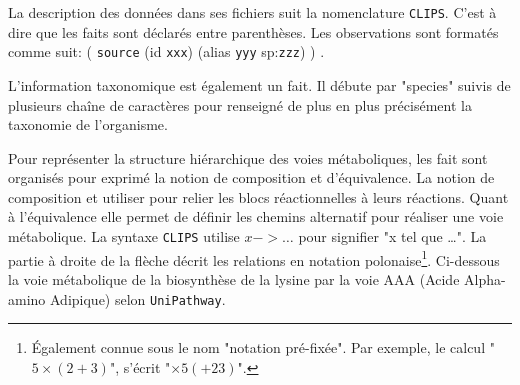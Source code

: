 \begin{refsegment}


La description des données dans ses fichiers suit la nomenclature \texttt{\gls{CLIPS}}. C'est à dire que les faits sont déclarés entre parenthèses. Les observations sont formatés comme suit: ( \texttt{source} (id \texttt{xxx}) (alias \texttt{yyy} sp:\texttt{zzz})  ) .



L'information taxonomique est également un fait. Il débute par "species" suivis de plusieurs chaîne de caractères pour renseigné de plus en plus précisément la taxonomie de l'organisme.


Pour représenter la structure hiérarchique des voies métaboliques, les fait sont organisés pour exprimé la notion de composition et d'équivalence. La notion de composition et utiliser pour relier les blocs réactionnelles à leurs réactions. Quant à l'équivalence elle permet de définir les chemins alternatif pour réaliser une voie métabolique. La syntaxe \texttt{\gls{CLIPS}} utilise $x -> \ldots$ pour signifier "x tel que \ldots". La partie à droite de la flèche décrit les relations en notation polonaise\footnote{Également connue sous le nom "notation pré-fixée". Par exemple, le calcul "$5 \times (2 + 3)$", s'écrit "$\times 5 (+ 2 3)$". }. Ci-dessous la voie métabolique de la biosynthèse de la lysine par la voie AAA (Acide Alpha-amino Adipique) selon \texttt{UniPathway}.


\end{refsegment}
